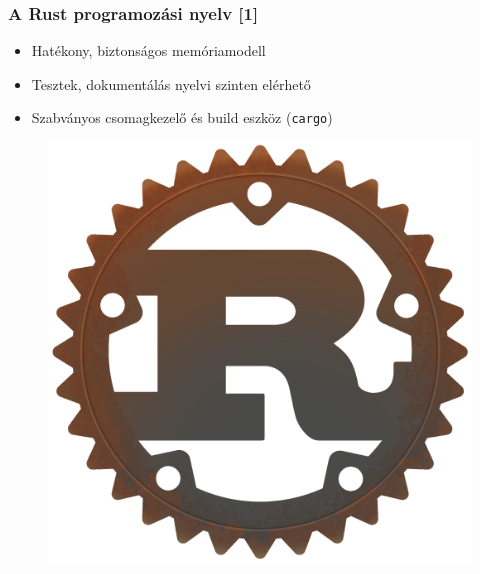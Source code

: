 \documentclass{beamer}
\begin{document}
\begin{frame}[fragile]
\frametitle{A Rust programozási nyelv [1]}

\begin{itemize}
\item Hatékony, biztonságos memóriamodell
\item Tesztek, dokumentálás nyelvi szinten elérhető
\item Szabványos csomagkezelő és build eszköz (\texttt{cargo})
\end{itemize}

\begin{figure}[htb]
\begin{center}
	\includegraphics[scale=0.25]{images/rust.png}
\end{center}
\end{figure}

\end{frame}
\end{document}
